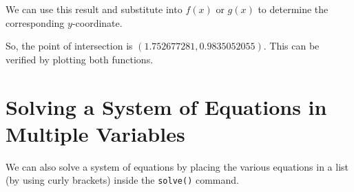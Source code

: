 \begin{maplegroup}
\begin{mapleinput}
\end{mapleinput}
\mapleresult
\begin{maplelatex}
\end{maplelatex}
\end{maplegroup}

We can use this result and substitute into $f(x)$ or $g(x)$ to determine the corresponding $y$-coordinate.

\begin{maplegroup}
\begin{mapleinput}
\end{mapleinput}
\mapleresult
\begin{maplelatex}
\end{maplelatex}
\end{maplegroup}

So, the point of intersection is $(1.752677281,0.9835052055)$. This can be verified by plotting both functions.

\begin{maplegroup}
\begin{mapleinput}
\end{mapleinput}
\mapleresult
{}
\end{maplegroup}

\section{Solving a System of Equations in Multiple Variables}
\label{sec:solvingsystemeqs}

We can also solve a system of equations by placing the various equations in a list (by using curly brackets) inside the \texttt{solve()} command.

\label{eg:solve_intersection_point}
\begin{maplegroup}
\begin{mapleinput}
\end{mapleinput}
\mapleresult
\begin{maplelatex}
\end{maplelatex}
\end{maplegroup}

